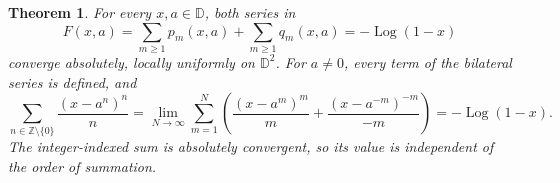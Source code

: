 \documentclass[11pt]{article}
\newtheorem{theorem}{Theorem}
\DeclareMathOperator{\Log}{Log}
\begin{document}
\begin{theorem}\label{thm:main}
For every $x,a\in\mathbb D$, both series in
\begin{equation}\label{eq:regular}
 F(x,a)=\sum_{m\geq1}p_m(x,a)+\sum_{m\geq1}q_m(x,a)
       =-\Log(1-x)
\end{equation}
converge absolutely, locally uniformly on $\mathbb D^2$.
For $a\ne0$, every term of the bilateral series is defined, and
\begin{equation}\label{eq:bilateral}
 \sum_{n\in\mathbb Z\setminus\{0\}}\frac{(x-a^n)^n}{n}
 =\lim_{N\to\infty}\sum_{m=1}^N
 \left(\frac{(x-a^m)^m}{m}+\frac{(x-a^{-m})^{-m}}{-m}\right)
 =-\Log(1-x).
\end{equation}
The integer-indexed sum is absolutely convergent, so its value is
independent of the order of summation.
\end{theorem}
\end{document}
